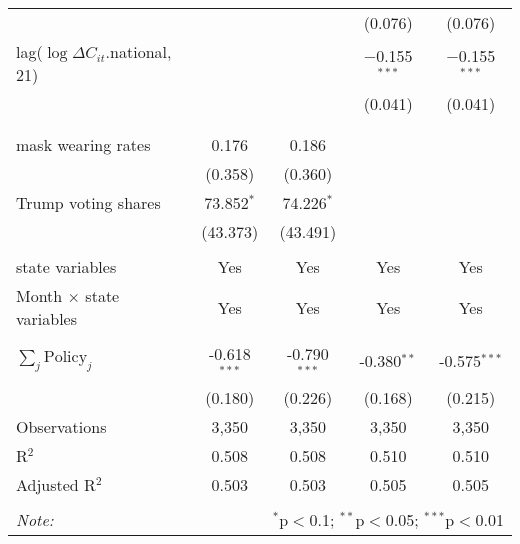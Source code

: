 \begin{tabular}{@{\extracolsep{1pt}}lcccc}
  &  &  & (0.076) & (0.076) \\ 
  lag($\log \Delta C_{it}$.national, 21) &  &  & $-$0.155$^{***}$ & $-$0.155$^{***}$ \\ 
  &  &  & (0.041) & (0.041) \\ 
   &  &  &  &  \\ 
  &  &  &  &  \\ 
  mask wearing rates & 0.176 & 0.186 &  &  \\ 
  & (0.358) & (0.360) &  &  \\ 
  Trump voting shares & 73.852$^{*}$ & 74.226$^{*}$ &  &  \\ 
  & (43.373) & (43.491) &  &  \\ 
 \hline \\[-1.8ex] 
state variables & Yes & Yes & Yes & Yes \\ 
Month $\times$ state variables & Yes & Yes & Yes & Yes \\ 
\hline \\[-1.8ex] 
$\sum_j \mathrm{Policy}_j$ & -0.618$^{***}$ & -0.790$^{***}$ & -0.380$^{**}$ & -0.575$^{***}$ \\ 
 & (0.180) & (0.226) & (0.168) & (0.215) \\ 
Observations & 3,350 & 3,350 & 3,350 & 3,350 \\ 
R$^{2}$ & 0.508 & 0.508 & 0.510 & 0.510 \\ 
Adjusted R$^{2}$ & 0.503 & 0.503 & 0.505 & 0.505 \\ 
\hline 
\hline \\[-1.8ex] 
\textit{Note:}  & \multicolumn{4}{r}{$^{*}$p$<$0.1; $^{**}$p$<$0.05; $^{***}$p$<$0.01} \\ 
\end{tabular} 